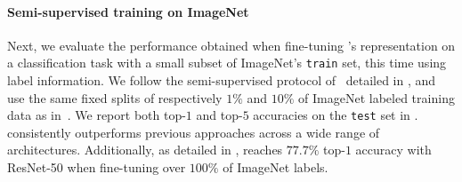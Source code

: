 \vfill
\paragraph{Semi-supervised training on ImageNet} 
Next, we evaluate the performance obtained when fine-tuning \algo's representation on a classification task with a small subset of ImageNet's \texttt{train\xspace} set, this time using label information. We follow the semi-supervised protocol of~\cite{kornblith2019better,dmlab,SimCLR,CPCv2} detailed in , and use the same fixed splits of respectively $1\%$ and $10\%$ of ImageNet labeled training data as in~\cite{SimCLR}. We report both top-$1$ and top-$5$ accuracies on the  \texttt{test\xspace} set in . \algo consistently outperforms previous approaches across a wide range of architectures. 
Additionally, as detailed in , \algo reaches $77.7\%$ top-$1$ accuracy with ResNet-50 when fine-tuning over $100\%$ of ImageNet labels. 

\vfill

